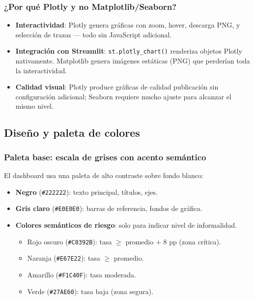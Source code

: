 \documentclass[12pt, a4paper]{article}
\begin{document}
\subsubsection{¿Por qué Plotly y no Matplotlib/Seaborn?}

\begin{itemize}[noitemsep]
  \item \textbf{Interactividad}: Plotly genera gráficas con zoom, hover, descarga PNG,
  y selección de trazas — todo sin JavaScript adicional.
  \item \textbf{Integración con Streamlit}: \texttt{st.plotly\_chart()} renderiza objetos
  Plotly nativamente. Matplotlib genera imágenes estáticas (PNG) que perderían toda la
  interactividad.
  \item \textbf{Calidad visual}: Plotly produce gráficas de calidad publicación sin
  configuración adicional; Seaborn requiere mucho ajuste para alcanzar el mismo nivel.
\end{itemize}

\subsection{Diseño y paleta de colores}

\subsubsection{Paleta base: escala de grises con acento semántico}

El dashboard usa una paleta de alto contraste sobre fondo blanco:

\begin{itemize}[noitemsep]
  \item \textbf{Negro} (\texttt{\#222222}): texto principal, títulos, ejes.
  \item \textbf{Gris claro} (\texttt{\#E0E0E0}): barras de referencia, fondos de gráfica.
  \item \textbf{Colores semánticos de riesgo}: solo para indicar nivel de informalidad.
    \begin{itemize}[noitemsep, label=$-$]
      \item Rojo oscuro (\texttt{\#C0392B}): tasa $\geq$ promedio + 8 pp (zona crítica).
      \item Naranja (\texttt{\#E67E22}): tasa $\geq$ promedio.
      \item Amarillo (\texttt{\#F1C40F}): tasa moderada.
      \item Verde (\texttt{\#27AE60}): tasa baja (zona segura).
    \end{itemize}
\end{itemize}
\end{document}
